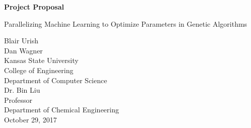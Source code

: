 \documentclass[letterpaper, 12pt]{article}
\begin{document}
\begin{titlepage}
\centering
	\vspace*{5.75cm}
	{\huge\bfseries Project Proposal\par}
	{\large Parallelizing Machine Learning to Optimize Parameters in Genetic Algorithms\par}
	\vspace{2cm}
	Blair Urish\\
	Dan Wagner\\
	Kansas State University\\
	College of Engineering\\
	Department of Computer Science\\
	\vspace{1cm}
	Dr. Bin Liu\\
	Professor\\
	Department of Chemical Engineering\\
	\vspace{1cm}
	October 29, 2017
\end{titlepage}

\begin{abstract}
\thispagestyle{plain}
\begin{flushleft}
	It is difficult for traditional materials to have some desirable traits that often conflict with one another.  Hybrid materials are crafted to solve this, but the compounds are difficult to identify.  Using machine learning and genetic algorithms to locate the traits of these compounds has had success but is inefficient in computing power.  Thus, we propose an approach to parallelize the process by distributing the work across several nodes in a master-slave relationship.  This method will allow the computation time to be spread across chunks of data, and result in an overall lower run time.
\end{flushleft}
\end{abstract}
\end{document}
